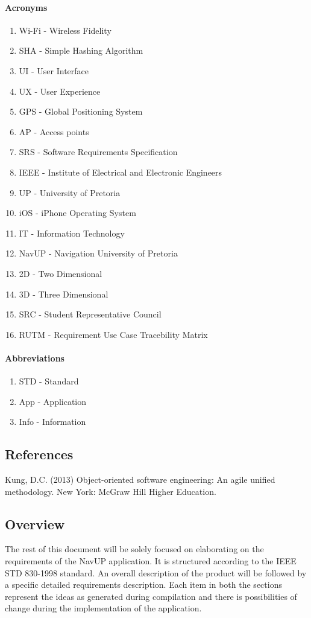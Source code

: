 \documentclass[runningheads,a4paper]{article}
\begin{document}
\paragraph{\textbf{Acronyms}}
\begin{enumerate}
	\item Wi-Fi - Wireless Fidelity 
	\item SHA - Simple Hashing Algorithm
	\item UI - User Interface
	\item UX - User Experience
	\item GPS - Global Positioning System
	\item AP - Access points
	\item SRS - Software Requirements Specification
	\item IEEE - Institute of Electrical and Electronic Engineers 
	\item UP - University of Pretoria
	\item iOS - iPhone Operating System 
	\item IT - Information Technology
	\item NavUP - Navigation University of Pretoria
	\item 2D - Two Dimensional
	\item 3D - Three Dimensional
	\item SRC - Student Representative Council
	\item RUTM - Requirement Use Case Tracebility Matrix
\end{enumerate}

\paragraph{\textbf{Abbreviations}}
\begin{enumerate}
	\item STD - Standard
	\item App - Application
	\item Info - Information
\end{enumerate}

\subsection{References}
Kung, D.C. (2013) Object-oriented software engineering: An agile unified methodology. New York: McGraw Hill Higher Education.

\subsection{Overview}
The rest of this document will be solely focused on elaborating on the requirements of the NavUP application. It is structured according to the IEEE STD 830-1998 standard. An overall description of the product will be followed by a specific detailed requirements description. Each item in both the sections represent the ideas as generated during compilation and there is possibilities of change during the implementation of the application.
\end{document}
